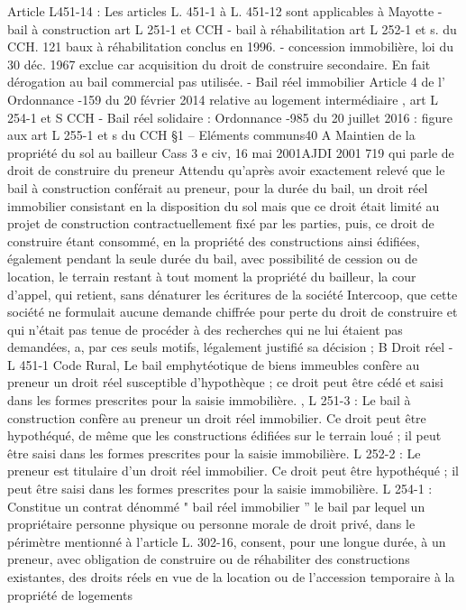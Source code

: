 \documentclass[11pt,a4paper]{report}
\begin{document}
	Article L451-14 : Les articles L. 451-1 à L. 451-12 sont applicables à Mayotte
	- bail à construction art L 251-1 et CCH
	- bail à réhabilitation art L 252-1 et s. du CCH. 121 baux à réhabilitation conclus en 1996.
	- concession immobilière, loi du 30 déc. 1967 exclue car acquisition du droit de construire secondaire. En fait
	dérogation au bail commercial pas utilisée.
	- Bail réel immobilier Article 4 de l' Ordonnance -159 du 20 février 2014 relative au logement
	intermédiaire , art L 254-1 et S CCH
	- Bail réel solidaire : Ordonnance -985 du 20 juillet 2016 : figure aux art L 255-1 et s du CCH
	§1 – Eléments communs40
	A Maintien de la propriété du sol au bailleur
	Cass 3 e civ, 16 mai 2001AJDI 2001 719 qui parle de droit de construire du preneur
	Attendu qu'après avoir exactement relevé que le bail à construction conférait au preneur, pour la durée du bail,
	un droit réel immobilier consistant en la disposition du sol mais que ce droit était limité au projet de
	construction contractuellement fixé par les parties, puis, ce droit de construire étant consommé, en la propriété
	des constructions ainsi édifiées, également pendant la seule durée du bail, avec possibilité de cession ou de
	location, le terrain restant à tout moment la propriété du bailleur, la cour d'appel, qui retient, sans dénaturer les
	écritures de la société Intercoop, que cette société ne formulait aucune demande chiffrée pour perte du droit de
	construire et qui n'était pas tenue de procéder à des recherches qui ne lui étaient pas demandées, a, par ces
	seuls motifs, légalement justifié sa décision ;
	B Droit réel
	- L 451-1 Code Rural, Le bail emphytéotique de biens immeubles confère au preneur un droit réel susceptible
	d'hypothèque ; ce droit peut être cédé et saisi dans les formes prescrites pour la saisie immobilière.
	, L 251-3 : Le bail à construction confère au preneur un droit réel immobilier.
	Ce droit peut être hypothéqué, de même que les constructions édifiées sur le terrain loué ; il peut être saisi dans
	les formes prescrites pour la saisie immobilière.
	L 252-2 : Le preneur est titulaire d'un droit réel immobilier. Ce droit peut être hypothéqué ; il peut être saisi
	dans les formes prescrites pour la saisie immobilière.
	L 254-1 : Constitue un contrat dénommé " bail réel immobilier ” le bail par lequel un propriétaire personne
	physique ou personne morale de droit privé, dans le périmètre mentionné à l'article L. 302-16, consent, pour une
	longue durée, à un preneur, avec obligation de construire ou de réhabiliter des constructions existantes, des
	droits réels en vue de la location ou de l'accession temporaire à la propriété de logements
\end{document}
